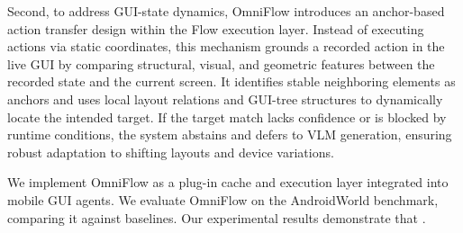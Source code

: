 Second, to address GUI-state dynamics, OmniFlow introduces an anchor-based action transfer design within the Flow execution layer.
Instead of executing actions via static coordinates, this mechanism grounds a recorded action in the live GUI by comparing structural, visual, and geometric features between the recorded state and the current screen.
It identifies stable neighboring elements as anchors and uses local layout relations and GUI-tree structures to dynamically locate the intended target.
If the target match lacks confidence or is blocked by runtime conditions, the system abstains and defers to VLM generation, ensuring robust adaptation to shifting layouts and device variations.

We implement OmniFlow as a plug-in cache and execution layer integrated into mobile GUI agents.
We evaluate OmniFlow on the AndroidWorld benchmark, comparing it against  baselines.
Our experimental results demonstrate that .



